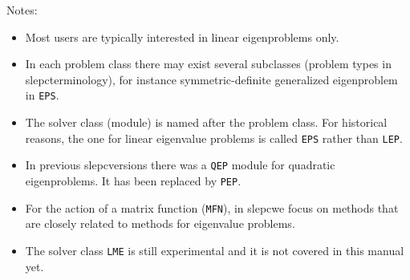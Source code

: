 \documentclass[titlepage,10pt,a4paper]{book}
\newcommand{\packnoi}[1]{{\sc #1}\xspace}
\newcommand{\slepc}{\texorpdfstring{\packnoi{slep\rm c}}{{SLEPc}}}
\begin{document}
{\noindent Notes:\vspace{-2mm}
\begin{itemize}
\setlength{\itemsep}{-2pt}
\item Most users are typically interested in linear eigenproblems only.
\item In each problem class there may exist several subclasses (problem types in \slepc terminology), for instance symmetric-definite generalized eigenproblem in \texttt{EPS}.
\item The solver class (module) is named after the problem class. For historical reasons, the one for linear eigenvalue problems is called \texttt{EPS} rather than \texttt{LEP}.
\item In previous \slepc versions there was a \texttt{QEP} module for quadratic eigenproblems. It has been replaced by \texttt{PEP}. %
\item For the action of a matrix function (\texttt{MFN}), in \slepc we focus on methods that are closely related to methods for eigenvalue problems.
\item The solver class \texttt{LME} is still experimental and it is not covered in this manual yet.
\end{itemize}

  \setlength{\parskip}{0cm}
  \tableofcontents
}
\cleardoublepage
{}
\pagestyle{fancy}
\renewcommand{\chaptermark}[1]{\markboth{\scriptsize \sffamily {\bfseries\chaptername\ \thechapter.} #1}{}}
\renewcommand{\sectionmark}[1]{\markright{\scriptsize \sffamily {\bfseries\thesection.} #1}{}}
\fancyhead{}
\fancyhead[LE,RO]{\nouppercase{\rightmark}}
\fancyhead[LO,RE]{\nouppercase{\leftmark}}
\fancyfoot[C]{\scriptsize --- \thepage\ ---}
\renewcommand{\headrulewidth}{0.2pt}
\renewcommand{\footrulewidth}{0.2pt}










\cleardoublepage
\fancyhead{}

%
%

\end{document}
